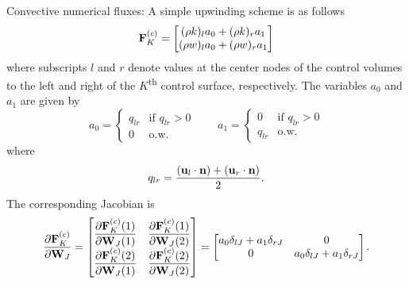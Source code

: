 \documentclass[oneside,a4paper,11pt]{report}
\begin{document}
Convective numerical fluxes:
A simple upwinding scheme is as follows
\begin{equation}
    \mathbf{F}^{(c)}_K  = \begin{bmatrix} (\rho k)_l a_0 + (\rho k)_r a_1 \\
                                     (\rho w)_l a_0 + (\rho w)_r a_1
                     \end{bmatrix}
\end{equation}
where subscripts $l$ and $r$ denote values at the center nodes of the control volumes to the left and right of the $K$\textsuperscript{th} control surface, respectively. The variables $a_0$ and $a_1$ are given by
\begin{equation}
    a_0 = \begin{cases} q_{lr} & \text{if }q_{lr} > 0 \\
                        0 & \text{o.w.}
    \end{cases}
\qquad
    a_1 = \begin{cases} 0 & \text{if }q_{lr} > 0 \\
                        q_{lr} & \text{o.w.}
    \end{cases}
\end{equation}
where
\begin{equation}
    q_{lr} = \frac{ (\mathbf{u}_l \cdot \mathbf{n}) + (\mathbf{u}_r \cdot \mathbf{n}) }{2}.
\end{equation}
The corresponding Jacobian is
\begin{equation}
    \frac{\partial \mathbf{F}^{(c)}_K}{\partial \mathbf{W}_J} = \begin{bmatrix}
    \dfrac{\partial \mathbf{F}^{(c)}_K(1)}{\partial \mathbf{W}_J(1)} & \dfrac{\partial \mathbf{F}^{(c)}_K(1)}{\partial \mathbf{W}_J(2)} \\
    \dfrac{\partial \mathbf{F}^{(c)}_K(2)}{\partial \mathbf{W}_J(1)} & \dfrac{\partial \mathbf{F}^{(c)}_K(2)}{\partial \mathbf{W}_J(2)} \end{bmatrix} = \begin{bmatrix}
    a_0 \delta_{lJ} + a_1 \delta_{rJ} & 0 \\
    0 & a_0 \delta_{lJ} + a_1 \delta_{rJ} \end{bmatrix}.
\end{equation}
\end{document}
